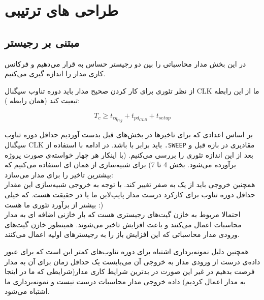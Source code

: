\section{طراحی های ترتیبی}
\subsection{ مبتنی بر رجیستر}


در این بخش مدار محاسباتی را بین دو رجیستر حساس به  قرار می‌دهیم و فرکانس کاری مدار را اندازه‌ گیری می‌کنیم.

از نظر تئوری برای کار کردن صحیح مدار باید دوره تناوب سیگنال CLK ما از این رابطه تبعیت کند (همان رابطه ):

{\Large
$$
    T_c \geq t_{cq_{reg}} + t_{pd_{CLB}} + t_{setup}
$$
}

بر اساس اعدادی که برای تاخیر‌ها در بخش‌های قبل بدست آوردیم حداقل دوره تناوب سیگنال CLK  باید برابر با  باشد.
در ادامه با استفاده از \texttt{.SWEEP} مقادیری در بازه قبل و بعد از این اندازه تئوری را بررسی می‌کنیم.
(با اینکار هر چهار خواسته‌ی صورت پروژه برآورده می‌شود. بخش 4 تا 7)
برای شبیه‌سازی از همان ای استفاده می‌کنیم که بیشترین تاخیر را برای مدار می‌سازد: \\
همچنین خروجی باید از یک به صفر تغییر کند.
با توجه به خروجی شبیه‌سازی این مقدار حداقل دوره تناوب برای کارکرد درست مدار پایپ‌لاین ما یا در حقیقت  هست.
که خیلی بیشتر از برآورد تئوری ما هست :)\\
احتمالا مربوط به خاز‌ن گیت‌های رجیستری هست که بار خازنی اضافه ای به مدار محاسبات اعمال می‌کنند و باعث افزایش تاخیر می‌شوند.
همینطور خاز‌ن گیت‌های ورودی مدار محاسباتی که این افزایش باز را به رجیستر‌های اولیه اعمال می‌کنند.

همچنین دلیل نمونه‌برداری اشتباه برای دوره تناوب‌های کمتر این‌ است که برای عبور داده‌ی درست از ورودی مدار به خروجی آن می‌بایست یک حداقل زمان برای آن به مدار فرصت بدهیم در غیر این صورت در بدترین شرایط کاری مدار(شرایطی که ما در اینجا به مدار اعمال کردیم) داده خروجی مدار محاسبات درست نیست و نمونه‌برداری ما اشتباه می‌شود.

